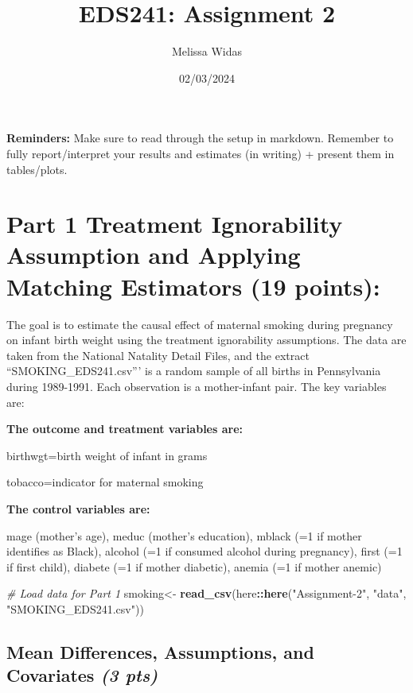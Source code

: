 \documentclass[
]{article}
\title{EDS241: Assignment 2}
\author{Melissa Widas}
\date{02/03/2024}
\newenvironment{Shaded}{\begin{snugshade}}{\end{snugshade}}
\newcommand{\CommentTok}[1]{\textcolor[rgb]{0.56,0.35,0.01}{\textit{#1}}}
\newcommand{\FunctionTok}[1]{\textcolor[rgb]{0.13,0.29,0.53}{\textbf{#1}}}
\newcommand{\NormalTok}[1]{#1}
\newcommand{\OtherTok}[1]{\textcolor[rgb]{0.56,0.35,0.01}{#1}}
\newcommand{\SpecialCharTok}[1]{\textcolor[rgb]{0.81,0.36,0.00}{\textbf{#1}}}
\newcommand{\StringTok}[1]{\textcolor[rgb]{0.31,0.60,0.02}{#1}}
\begin{document}
\maketitle

\textbf{Reminders:} Make sure to read through the setup in markdown.
Remember to fully report/interpret your results and estimates (in
writing) + present them in tables/plots.

\hypertarget{part-1-treatment-ignorability-assumption-and-applying-matching-estimators-19-points}{%
\section{Part 1 Treatment Ignorability Assumption and Applying Matching
Estimators (19
points):}\label{part-1-treatment-ignorability-assumption-and-applying-matching-estimators-19-points}}

The goal is to estimate the causal effect of maternal smoking during
pregnancy on infant birth weight using the treatment ignorability
assumptions. The data are taken from the National Natality Detail Files,
and the extract ``SMOKING\_EDS241.csv''' is a random sample of all
births in Pennsylvania during 1989-1991. Each observation is a
mother-infant pair. The key variables are:

\textbf{The outcome and treatment variables are:}

\indent birthwgt=birth weight of infant in grams

\indent tobacco=indicator for maternal smoking

\textbf{The control variables are:}

\indent mage (mother's age), meduc (mother's education), mblack (=1 if
mother identifies as Black), alcohol (=1 if consumed alcohol during
pregnancy), first (=1 if first child), diabete (=1 if mother diabetic),
anemia (=1 if mother anemic)

\begin{Shaded}
\begin{Highlighting}[]
\CommentTok{\# Load data for Part 1}
\NormalTok{smoking}\OtherTok{\textless{}{-}} \FunctionTok{read\_csv}\NormalTok{(here}\SpecialCharTok{::}\FunctionTok{here}\NormalTok{(}\StringTok{"Assignment{-}2"}\NormalTok{, }\StringTok{"data"}\NormalTok{, }\StringTok{"SMOKING\_EDS241.csv"}\NormalTok{))}
\end{Highlighting}
\end{Shaded}

\hypertarget{mean-differences-assumptions-and-covariates-3-pts}{%
\subsection{\texorpdfstring{Mean Differences, Assumptions, and
Covariates \emph{(3
pts)}}{Mean Differences, Assumptions, and Covariates (3 pts)}}\label{mean-differences-assumptions-and-covariates-3-pts}}
\end{document}
